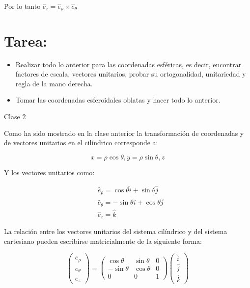 Por lo tanto $\hat{e}_{z}=\hat{e}_{\rho} \times \hat{e}_{\theta}$

\section{Tarea:}
\begin{itemize}
  \item Realizar todo lo anterior para las coordenadas esféricas, es decir, encontrar factores de escala, vectores unitarios, probar su ortogonalidad, unitariedad y regla de la mano derecha.

  \item Tomar las coordenadas esferoidales oblatas y hacer todo lo anterior.

\end{itemize}


Clase 2

Como ha sido mostrado en la clase anterior la transformación de coordenadas y de vectores unitarios en el cilíndrico corresponde a:

$$
x=\rho \cos \theta, y=\rho \sin \theta, z
$$

$\mathrm{Y}$ los vectores unitarios como:

$$
\begin{aligned}
& \hat{e}_{\rho}=\cos \theta \hat{i}+\sin \theta \hat{j} \\
& \widehat{e}_{\theta}=-\sin \theta \hat{i}+\cos \theta \hat{j} \\
& \widehat{e}_{z}=\widehat{k}
\end{aligned}
$$

La relación entre los vectores unitarios del sistema cilíndrico y del sistema cartesiano pueden escribirse matricialmente de la siguiente forma:

$$
\left(\begin{array}{l}
\hat{e}_{\rho} \\
\hat{e}_{\theta} \\
\hat{e}_{z}
\end{array}\right)=\left(\begin{array}{ccc}
\cos \theta & \sin \theta & 0 \\
-\sin \theta & \cos \theta & 0 \\
0 & 0 & 1
\end{array}\right)\left(\begin{array}{l}
\hat{i} \\
\hat{j} \\
\hat{k}
\end{array}\right)
$$

